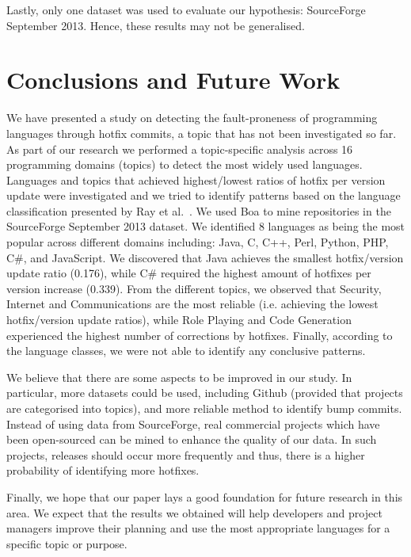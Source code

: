 \documentclass{sig-alternate}
\begin{document}
Lastly, only one dataset was used to evaluate our hypothesis: SourceForge September 2013. Hence, these results may not be generalised.

\section{Conclusions and Future Work}
We have presented a study on detecting the fault-proneness of programming languages through hotfix commits, a topic that has not been investigated so far. As part of our research we performed a topic-specific analysis across 16 programming domains (topics) to detect the most widely used languages. Languages and topics that achieved highest/lowest ratios of hotfix per version update were investigated and we tried to identify patterns based on the language classification presented by Ray et al.~\cite{Ray2014}. We used Boa to mine repositories in the SourceForge September 2013 dataset. %
We identified 8 languages as being the most popular across different domains including: Java, C, C++, Perl, Python, PHP, C\#, and JavaScript. We discovered that Java achieves the smallest hotfix/version update ratio (0.176), while C\# required the highest amount of hotfixes per version increase (0.339). From the different topics, we observed that Security, Internet and Communications are the most reliable (i.e. achieving the lowest hotfix/version update ratios), while Role Playing and Code Generation experienced the highest number of corrections by hotfixes. Finally, according to the language classes, we were not able to identify any conclusive patterns.

We believe that there are some aspects to be improved in our study. In particular, more datasets could be used, including Github (provided that projects are categorised into topics), and more reliable method to identify bump commits. Instead of using data from SourceForge, real commercial projects which have been open-sourced can be mined to enhance the quality of our data. In such projects, releases should occur more frequently and thus, there is a higher probability of identifying more hotfixes.

Finally, we hope that our paper lays a good foundation for future research in this area. We expect that the results we obtained will help developers and project managers improve their planning and use the most appropriate languages for a specific topic or purpose.


 

\end{document}
